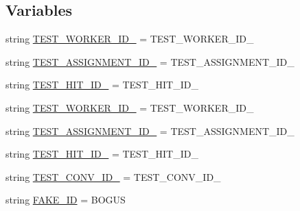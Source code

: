 \subsection*{Variables}
\begin{DoxyCompactItemize}
\item 
string \hyperlink{namespaceparlai_1_1mturk_1_1core_1_1dev_1_1test_1_1test__socket__manager_ac015e4931305b966d6511d655547ed31}{T\+E\+S\+T\+\_\+\+W\+O\+R\+K\+E\+R\+\_\+\+I\+D\+\_} = \textquotesingle{}T\+E\+S\+T\+\_\+\+W\+O\+R\+K\+E\+R\+\_\+\+I\+D\+\_\textquotesingle{}
\item 
string \hyperlink{namespaceparlai_1_1mturk_1_1core_1_1dev_1_1test_1_1test__socket__manager_a414d5248d46bc359efc7fe340f0a0d58}{T\+E\+S\+T\+\_\+\+A\+S\+S\+I\+G\+N\+M\+E\+N\+T\+\_\+\+I\+D\+\_} = \textquotesingle{}T\+E\+S\+T\+\_\+\+A\+S\+S\+I\+G\+N\+M\+E\+N\+T\+\_\+\+I\+D\+\_\textquotesingle{}
\item 
string \hyperlink{namespaceparlai_1_1mturk_1_1core_1_1dev_1_1test_1_1test__socket__manager_ab03a9b20d613c3edbd1a58d2091c0dd8}{T\+E\+S\+T\+\_\+\+H\+I\+T\+\_\+\+I\+D\+\_} = \textquotesingle{}T\+E\+S\+T\+\_\+\+H\+I\+T\+\_\+\+I\+D\+\_\textquotesingle{}
\item 
string \hyperlink{namespaceparlai_1_1mturk_1_1core_1_1dev_1_1test_1_1test__socket__manager_a3e9b93f285414f7de24be5def63d3a2c}{T\+E\+S\+T\+\_\+\+W\+O\+R\+K\+E\+R\+\_\+\+I\+D\+\_} = \textquotesingle{}T\+E\+S\+T\+\_\+\+W\+O\+R\+K\+E\+R\+\_\+\+I\+D\+\_\textquotesingle{}
\item 
string \hyperlink{namespaceparlai_1_1mturk_1_1core_1_1dev_1_1test_1_1test__socket__manager_ad9dd33a6060b10348a94d0d6f7631832}{T\+E\+S\+T\+\_\+\+A\+S\+S\+I\+G\+N\+M\+E\+N\+T\+\_\+\+I\+D\+\_} = \textquotesingle{}T\+E\+S\+T\+\_\+\+A\+S\+S\+I\+G\+N\+M\+E\+N\+T\+\_\+\+I\+D\+\_\textquotesingle{}
\item 
string \hyperlink{namespaceparlai_1_1mturk_1_1core_1_1dev_1_1test_1_1test__socket__manager_a6cff4c9c07672b2825cd683fbd70177d}{T\+E\+S\+T\+\_\+\+H\+I\+T\+\_\+\+I\+D\+\_} = \textquotesingle{}T\+E\+S\+T\+\_\+\+H\+I\+T\+\_\+\+I\+D\+\_\textquotesingle{}
\item 
string \hyperlink{namespaceparlai_1_1mturk_1_1core_1_1dev_1_1test_1_1test__socket__manager_a4a79b23133ad14c507cb853ec641ce91}{T\+E\+S\+T\+\_\+\+C\+O\+N\+V\+\_\+\+I\+D\+\_} = \textquotesingle{}T\+E\+S\+T\+\_\+\+C\+O\+N\+V\+\_\+\+I\+D\+\_\textquotesingle{}
\item 
string \hyperlink{namespaceparlai_1_1mturk_1_1core_1_1dev_1_1test_1_1test__socket__manager_affe00f38cbd54630cfde04065d798cca}{F\+A\+K\+E\+\_\+\+ID} = \textquotesingle{}B\+O\+G\+US\textquotesingle{}

\end{DoxyCompactItemize}
